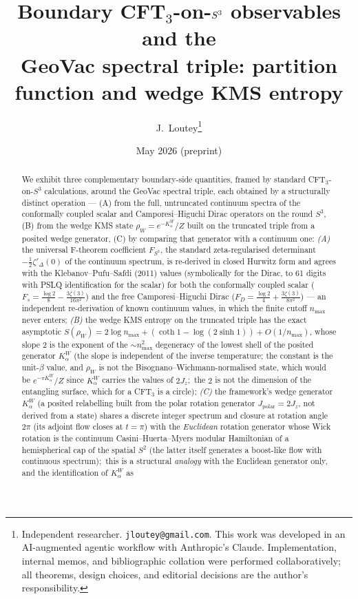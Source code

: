 \documentclass[11pt,a4paper]{article}
\title{Boundary CFT$_{3}$-on-$\sthree$ observables and the\\
GeoVac spectral triple: partition function and wedge KMS entropy}
\author{J.~Loutey\thanks{Independent researcher. \texttt{jloutey@gmail.com}.
This work was developed in an AI-augmented agentic workflow with
Anthropic's Claude. Implementation, internal memos, and bibliographic
collation were performed collaboratively; all theorems, design choices,
and editorial decisions are the author's responsibility.}}
\date{May 2026 (preprint)}
\theoremstyle{plain}
\theoremstyle{definition}
\newcommand{\nmax}{n_{\max}}
\newcommand{\sthree}{S^{3}}
\newcommand{\Kalpha}{K_{\alpha}^{W}}
\newcommand{\rhoW}{\rho_{W}}
\begin{document}
\maketitle

\begin{abstract}
We exhibit three complementary boundary-side quantities, framed by
standard CFT$_{3}$-on-$\sthree$ calculations, around the GeoVac
spectral triple, each obtained by
a structurally distinct operation --- (A) from the full, untruncated
continuum spectra of the conformally coupled scalar and
Camporesi--Higuchi Dirac operators on the round $\sthree$, (B) from the
wedge KMS state $\rhoW = e^{-\Kalpha}/Z$ built on the truncated triple
from a posited wedge generator, (C) by
comparing that generator with a continuum one: \emph{(A)} the universal F-theorem
coefficient $F_{\sthree}$, the standard zeta-regularised determinant
$-\tfrac{1}{2}\zeta'_{\Delta}(0)$ of the continuum spectrum, is
re-derived in closed Hurwitz form and agrees with the
Klebanov--Pufu--Safdi (2011) values (symbolically for the Dirac, to
61 digits with PSLQ identification for the scalar) for both the conformally coupled
scalar ($F_{s} = \tfrac{\log 2}{8} - \tfrac{3\zeta(3)}{16\pi^{2}}$) and
the free Camporesi--Higuchi Dirac ($F_{D} = \tfrac{\log 2}{4} +
\tfrac{3\zeta(3)}{8\pi^{2}}$) --- an independent re-derivation of known
continuum values, in which the finite cutoff $\nmax$ never enters;
\emph{(B)} the wedge KMS entropy on the truncated triple has the exact
asymptotic $S(\rhoW) = 2\log\nmax + (\coth 1 - \log(2\sinh 1)) +
O(1/\nmax)$, whose slope $2$ is the exponent of the $\sim\nmax^{2}$
degeneracy of the lowest shell of the posited generator $\Kalpha$ (the
slope is independent of the inverse temperature; the constant is the
unit-$\beta$ value, and $\rhoW$ is not the Bisognano--Wichmann-normalised
state, which would be $e^{-\pi\Kalpha}/Z$ since $\Kalpha$ carries the
values of $2J_{z}$;\ the $2$ is not the dimension of the entangling
surface, which for a CFT$_{3}$ is a circle); \emph{(C)} the framework's wedge generator $\Kalpha$
(a posited relabelling built from the polar rotation generator
$J_{\mathrm{polar}} = 2J_z$, not derived from a state) shares a discrete
integer spectrum and closure at rotation angle $2\pi$ (its adjoint flow
closes at $t = \pi$) with the
\emph{Euclidean} rotation generator whose Wick rotation is the
continuum Casini--Huerta--Myers modular Hamiltonian of a hemispherical
cap of the spatial $S^{2}$ (the latter itself generates a boost-like flow with continuous spectrum);\ this
is a structural \emph{analogy} with the Euclidean generator only, and the identification of $\Kalpha$ as

\end{abstract}
\end{document}

